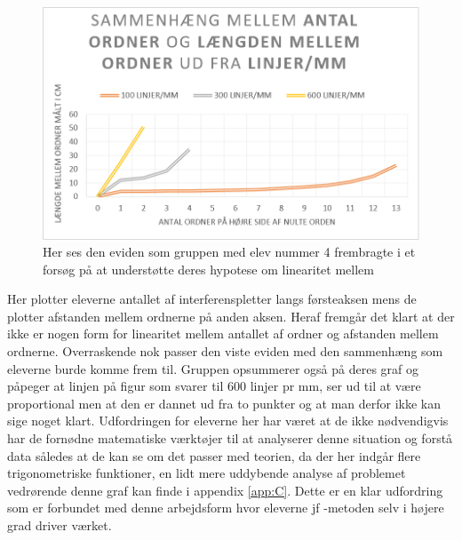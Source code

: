 \begin{figure}[h!]
	\centering
	\includegraphics[width=\textwidth]{Figs/EviJacob}
	\caption[Elev produktion 3]{Her ses den eviden som gruppen med elev nummer 4 frembragte i et forsøg på at understøtte deres hypotese om linearitet mellem }
	\label{fig:evidens.jacob}
\end{figure}

Her plotter eleverne antallet af interferenspletter langs førsteaksen mens de plotter afstanden mellem ordnerne på anden aksen. Heraf fremgår det klart at der ikke er nogen form for linearitet mellem antallet af ordner og afstanden mellem ordnerne. Overraskende nok passer den viste eviden med den sammenhæng som eleverne burde komme frem til. Gruppen opsummerer også på deres graf og påpeger at linjen på figur  som svarer til 600 linjer pr mm, ser ud til at være proportional men at den er dannet ud fra to punkter og at man derfor ikke kan sige noget klart. 
Udfordringen for eleverne her har været at de ikke nødvendigvis har de fornødne matematiske værktøjer til at analyserer denne situation og forstå data således at de kan se om det passer med teorien, da der her indgår flere trigonometriske funktioner, en lidt mere uddybende analyse af problemet vedrørende denne graf kan finde i appendix \vref{app:C}. Dette er en klar udfordring som er forbundet med denne arbejdsform hvor eleverne jf \ib-metoden selv i højere grad driver værket. 

